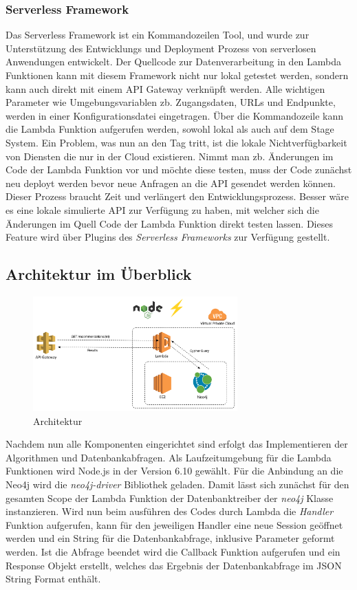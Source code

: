 \subsubsection{Serverless Framework}
Das Serverless Framework ist ein Kommandozeilen Tool, und wurde zur Unterstützung des Entwicklungs und Deployment Prozess von serverlosen Anwendungen entwickelt. 
Der Quellcode zur Datenverarbeitung in den Lambda Funktionen kann mit diesem Framework nicht nur lokal getestet werden, sondern kann auch direkt mit einem API Gateway verknüpft werden. Alle wichtigen Parameter wie Umgebungsvariablen zb. Zugangsdaten, URLs und Endpunkte, werden in einer Konfigurationsdatei eingetragen. Über die Kommandozeile kann die Lambda Funktion aufgerufen werden, sowohl lokal als auch auf dem Stage System. 
Ein Problem, was nun an den Tag tritt, ist die lokale Nichtverfügbarkeit von Diensten die nur in der Cloud existieren. Nimmt man zb. Änderungen im Code der Lambda Funktion vor und möchte diese testen, muss der Code zunächst neu deployt werden bevor neue Anfragen an die API gesendet werden können. Dieser Prozess braucht Zeit und verlängert den Entwicklungsprozess. Besser wäre es eine lokale simulierte API zur Verfügung zu haben, mit welcher sich die Änderungen im Quell Code der Lambda Funktion direkt testen lassen. Dieses Feature wird über Plugins des \textit{Serverless Frameworks} zur Verfügung gestellt.

\subsection{Architektur im Überblick}

\begin{figure}[htb]
 \centering
 \includegraphics[width=0.7\textwidth,angle=0]{abb/Architecture}
 \caption[Beschreibung]{Architektur}
\label{fig:Architektur}
\end{figure}

Nachdem nun alle Komponenten eingerichtet sind erfolgt das Implementieren der Algorithmen und Datenbankabfragen. Als Laufzeitumgebung für die Lambda Funktionen wird Node.js in der Version 6.10 gewählt. Für die Anbindung an die Neo4j wird die \textit{neo4j-driver} Bibliothek geladen. Damit lässt sich zunächst für den gesamten Scope der Lambda Funktion der Datenbanktreiber der \textit{neo4j} Klasse instanzieren. 
Wird nun beim ausführen des Codes durch Lambda die \textit{Handler} Funktion aufgerufen, kann für den jeweiligen Handler eine neue Session geöffnet werden und ein String für die Datenbankabfrage, inklusive Parameter geformt werden. Ist die Abfrage beendet wird die Callback Funktion aufgerufen und ein Response Objekt erstellt, welches das Ergebnis der Datenbankabfrage im JSON String Format enthält.

